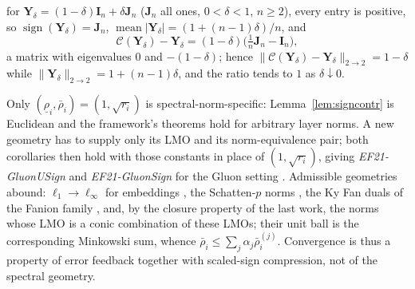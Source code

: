 \begin{remark}\label{rem:normmismatch}
 for $\mathbf{Y}_\delta = (1-\delta)\mathbf{I}_n + \delta\mathbf{J}_n$ ($\mathbf{J}_n$ all ones, $0<\delta<1$, $n \ge 2$), every entry is positive, so $\operatorname{sign}(\mathbf{Y}_\delta) = \mathbf{J}_n$, $\operatorname{mean}|\mathbf{Y}_\delta| = (1+(n-1)\delta)/n$, and
\begin{equation*}
\mathcal{C}(\mathbf{Y}_\delta) - \mathbf{Y}_\delta = (1-\delta)\bigl(\tfrac{1}{n}\mathbf{J}_n - \mathbf{I}_n\bigr),
\end{equation*}
a matrix with eigenvalues $0$ and $-(1-\delta)$; hence $\|\mathcal{C}(\mathbf{Y}_\delta)-\mathbf{Y}_\delta\|_{2\to2} = 1-\delta$ while $\|\mathbf{Y}_\delta\|_{2\to2} = 1+(n-1)\delta$, and the ratio tends to $1$ as $\delta\downarrow 0$.
\end{remark}

\begin{remark}\label{rem:gluon}
Only $(\underline{\rho}_i,\bar{\rho}_i) = (1,\sqrt{r_i})$ is spectral-norm-specific: Lemma~\ref{lem:signcontr} is Euclidean and the framework's theorems hold for arbitrary layer norms. A new geometry has to supply only its LMO and its norm-equivalence pair; both corollaries then hold with those constants in place of $(1,\sqrt{r_i})$, giving \emph{EF21-GluonUSign} and \emph{EF21-GluonSign} for the Gluon setting \citep{riabinin2025gluon}. Admissible geometries abound: $\ell_1\to\ell_\infty$ for embeddings \citep{pethick2025training}, the Schatten-$p$ norms \citep{cesista2025schattenp}, the Ky Fan duals of the Fanion family \citep{kravatskiy2025kyfannorms}, and, by the closure property of the last work, the norms whose LMO is a conic combination of these LMOs; their unit ball is the corresponding Minkowski sum, whence $\bar{\rho}_i \le \sum_j\alpha_j\bar{\rho}_i^{(j)}$. Convergence is thus a property of error feedback together with scaled-sign compression, not of the spectral geometry.
\end{remark}
